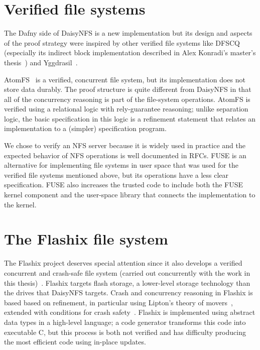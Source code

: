 \section{Verified file systems}
\label{sec:rel:verified-fs}

The Dafny side of DaisyNFS is a new implementation but its design and aspects of
the proof strategy were inspired by other verified file systems like
DFSCQ~\cite{chen:dfscq} (especially its indirect block implementation described
in Alex Konradi's master's thesis~\cite{akonradi-meng}) and
Yggdrasil~\cite{sigurbjarnarson:yggdrasil}.

AtomFS~\cite{zou:atomfs} is a verified, concurrent file system, but its
implementation does not store data durably. The proof structure is quite
different from DaisyNFS in that all of the concurrency reasoning is part of the
file-system operations. AtomFS is verified using a relational logic with rely-guarantee
reasoning; unlike separation logic, the basic specification in this logic is a
refinement statement that relates an implementation to a (simpler) specification
program.

We chose to verify an NFS server because it is widely used in practice and the
expected behavior of NFS operations is well documented in RFCs. FUSE is an
alternative for implementing file systems in user space that was used for the
verified file systems mentioned above, but its operations have a less clear
specification. FUSE also increases the trusted code to include both the FUSE
kernel component and the user-space library that connects the implementation to
the kernel.

\section{The Flashix file system}
\label{sec:rel:flashix}

The Flashix project deserves special attention since it also develops a verified
concurrent and crash-safe file system (carried out concurrently with the work in this thesis)~\cite{bodenmuller:concurrent-flashix}.
Flashix targets flash storage, a lower-level storage technology than the drives
that DaisyNFS targets. Crash and concurrency reasoning in Flashix is based based
on refinement, in particular using Lipton's theory of
movers~\cite{lipton:movers}, extended with conditions for crash
safety~\cite[\S 13.3]{Pfaehler2018}. Flashix is implemented using abstract data
types in a high-level language; a code generator transforms this code into
executable C, but this process is both not verified and has difficulty producing
the most efficient code using in-place updates.

